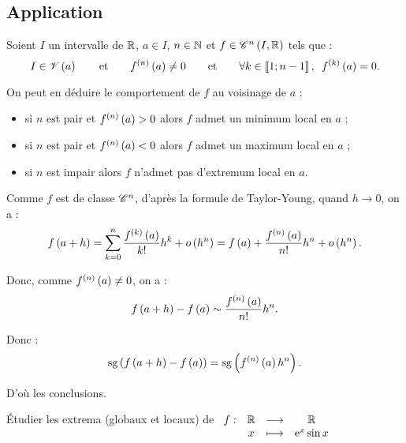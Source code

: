 \subsection{Application}

\begin{appl}
Soient \(I\) un intervalle de \(\mathbb{R}\), \(a\in I\), \(n\in\mathbb{N}\) et \(f\in\mathscr{C}^{n}\left(I,\mathbb{R}\right)\) tels que : \[I\in\V{a}\qquad\text{et}\qquad f\deriv{n}\paren{a}\not=0\qquad\text{et}\qquad\quantifs{\forall k\in\interventierii{1}{n-1}}f\deriv{k}\paren{a}=0.\]

On peut en déduire le comportement de \(f\) au voisinage de \(a\) :

\begin{itemize}
    \item si \(n\) est pair et \(f^{\left(n\right)}\left(a\right)>0\) alors \(f\) admet un minimum local en \(a\) ; \\
    \item si \(n\) est pair et \(f^{\left(n\right)}\left(a\right)<0\) alors \(f\) admet un maximum local en \(a\) ; \\
    \item si \(n\) est impair alors \(f\) n'admet pas d'extremum local en \(a\).
\end{itemize}
\end{appl}

\begin{dem}
Comme \(f\) est de classe \(\mathscr{C}^{n}\), d'après la formule de Taylor-Young, quand \(h\to0\), on a : \[f\left(a+h\right)=\sum_{k=0}^n\dfrac{f^{\left(k\right)}\left(a\right)}{k!}h^k+o\left(h^n\right)=f\left(a\right)+\dfrac{f^{\left(n\right)}\left(a\right)}{n!}h^n+o\left(h^n\right).\]

Donc, comme \(f^{\left(n\right)}\left(a\right)\not=0\), on a : \[f\left(a+h\right)-f\left(a\right)\sim\dfrac{f^{\left(n\right)}\left(a\right)}{n!}h^n.\]

Donc : \[\operatorname{sg}\left(f\left(a+h\right)-f\left(a\right)\right)=\operatorname{sg}\left(f^{\left(n\right)}\left(a\right)h^n\right).\]

D'où les conclusions.
\end{dem}

\begin{exoex}
Étudier les extrema (globaux et locaux) de \(\begin{array}[t]{cccc}f : & \mathbb{R} & \longrightarrow & \mathbb{R} \\ & x & \longmapsto & \mathrm{e}^{x}\sin x\end{array}\)
\end{exoex}

